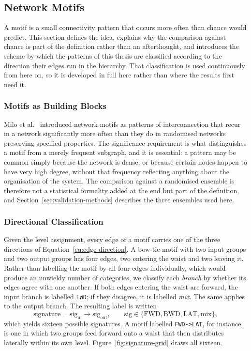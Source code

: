 \documentclass[12pt,a4paper,oneside]{article}
\theoremstyle{definition}
\theoremstyle{plain}
\newcommand{\code}[1]{\texttt{#1}}
\begin{document}
\subsection{Network Motifs}
\label{sec:motifs}


A motif is a small connectivity pattern that occurs more often than chance
would predict. This section defines the idea, explains why the comparison
against chance is part of the definition rather than an afterthought, and
introduces the scheme by which the patterns of this thesis are classified
according to the direction their edges run in the hierarchy. That
classification is used continuously from here on, so it is developed in full
here rather than where the results first need it.

\subsubsection{Motifs as Building Blocks}

Milo et al.\ \cite{milo2002} introduced network motifs as patterns of
interconnection that recur in a network significantly more often than they
do in randomised networks preserving specified properties. The significance
requirement is what distinguishes a motif from a merely frequent subgraph,
and it is essential: a pattern may be common simply because the network is
dense, or because certain nodes happen to have very high degree, without
that frequency reflecting anything about the organisation of the system. The
comparison against a randomised ensemble is therefore not a statistical
formality added at the end but part of the definition, and
Section~\ref{sec:validation-methods} describes the three ensembles used
here.

\subsubsection{Directional Classification}

Given the level assignment, every edge of a motif carries one of the three
directions of Equation~\eqref{eq:edge-direction}. A bow-tie motif with two
input groups and two output groups has four edges, two entering the waist
and two leaving it. Rather than labelling the motif by all four edges
individually, which would produce an unwieldy number of categories, we
classify each \emph{branch} by whether its edges agree with one another. If
both edges entering the waist are forward, the input branch is labelled
\code{FWD}; if they disagree, it is labelled \emph{mix}. The same applies to the
output branch. The resulting label is written
\begin{equation}
  \label{eq:signature}
  \mathrm{signature} = \mathrm{sig}_{\mathrm{in}} \rightarrow
                       \mathrm{sig}_{\mathrm{out}},
  \qquad
  \mathrm{sig} \in \{\mathrm{FWD},\mathrm{BWD},\mathrm{LAT},\mathrm{mix}\},
\end{equation}
which yields sixteen possible signatures. A motif labelled
\code{FWD->LAT}, for instance, is one in which two groups feed forward onto a
waist that then distributes laterally within its own level.
Figure~\ref{fig:signature-grid} draws all sixteen.
\end{document}
